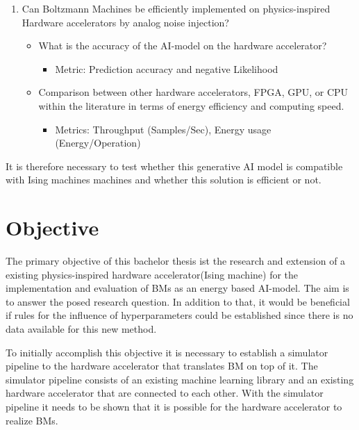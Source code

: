 \begin{enumerate}
    \item Can Boltzmann Machines be efficiently implemented on physics-inspired Hardware accelerators by analog noise injection?
        \begin{itemize}
            \item What is the accuracy of the AI-model on the hardware accelerator?
                \begin{itemize}
                    \item Metric: Prediction accuracy and negative Likelihood
                \end{itemize}
            \item Comparison between other hardware accelerators, FPGA, GPU, or CPU within the literature in terms of energy efficiency and computing speed.
                \begin{itemize}
                    \item Metrics: Throughput (Samples/Sec), Energy usage (Energy/Operation)
                \end{itemize}
        \end{itemize}  
\end{enumerate}

It is therefore necessary to test whether this generative AI model is compatible with Ising machines
machines and whether this solution is efficient or not.


\section{Objective}

The primary objective of this bachelor thesis ist the research and extension of a existing physics-inspired
hardware accelerator(Ising machine) for the implementation and evaluation of \ac{BM}s as an energy based 
AI-model. The aim is to answer the posed research question. 
In addition to that, it would be beneficial if rules for the influence of hyperparameters could be established
since there is no data available for this new method.

To initially accomplish this objective it is necessary to establish a simulator pipeline to the
hardware accelerator that translates \ac{BM} on top of it.
The simulator pipeline consists of an existing machine learning library and an existing hardware accelerator
that are connected to each other.
With the simulator pipeline it needs to be shown that it is possible for the hardware accelerator
to realize \ac{BM}s.

